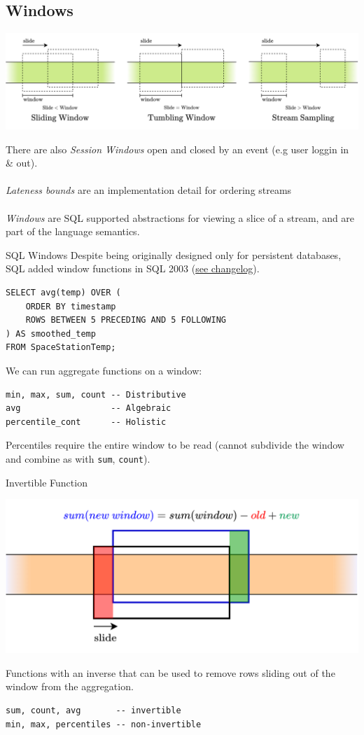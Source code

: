 \subsection{Windows}
\begin{center}
    \includegraphics[width=.9\textwidth]{streams/images/window_types.drawio.png}
\end{center}
There are also \textit{Session Windows} open and closed by an event (e.g user loggin in \& out).
\\
\\ \textit{Lateness bounds} are an implementation detail for ordering streams
\\
\\ \textit{Windows} are SQL supported abstractions for viewing a slice of a stream, and are part of the language semantics.
\begin{sidenotebox}{SQL Windows}
    Despite being originally designed only for persistent databases, SQL added window functions in SQL 2003 (\href{https://en.wikipedia.org/wiki/SQL:2003}{see changelog}).
\end{sidenotebox}
\begin{verbatim}
SELECT avg(temp) OVER (
    ORDER BY timestamp
    ROWS BETWEEN 5 PRECEDING AND 5 FOLLOWING
) AS smoothed_temp
FROM SpaceStationTemp;
\end{verbatim}
We can run aggregate functions on a window:
\begin{verbatim}
min, max, sum, count -- Distributive
avg                  -- Algebraic
percentile_cont      -- Holistic
\end{verbatim}
Percentiles require the entire window to be read (cannot subdivide the window and combine as with \texttt{sum}, \texttt{count}).
\begin{definitionbox}{Invertible Function}
    \begin{center}
        \includegraphics[width=.7\textwidth]{streams/images/invertible_agreggate.drawio.png}
    \end{center}
    Functions with an inverse that can be used to remove rows sliding out of the window from the aggregation.
    \begin{verbatim}
sum, count, avg       -- invertible
min, max, percentiles -- non-invertible
    \end{verbatim}
\end{definitionbox}

